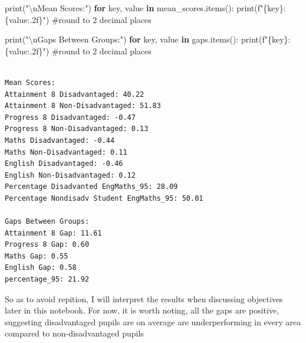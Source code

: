 \documentclass[
  letterpaper,
  DIV=11,
  numbers=noendperiod]{scrartcl}
\newenvironment{Shaded}{\begin{snugshade}}{\end{snugshade}}
\newcommand{\BuiltInTok}[1]{\textcolor[rgb]{0.00,0.23,0.31}{#1}}
\newcommand{\CharTok}[1]{\textcolor[rgb]{0.13,0.47,0.30}{#1}}
\newcommand{\CommentTok}[1]{\textcolor[rgb]{0.37,0.37,0.37}{#1}}
\newcommand{\ControlFlowTok}[1]{\textcolor[rgb]{0.00,0.23,0.31}{\textbf{#1}}}
\newcommand{\KeywordTok}[1]{\textcolor[rgb]{0.00,0.23,0.31}{\textbf{#1}}}
\newcommand{\NormalTok}[1]{\textcolor[rgb]{0.00,0.23,0.31}{#1}}
\newcommand{\SpecialCharTok}[1]{\textcolor[rgb]{0.37,0.37,0.37}{#1}}
\newcommand{\SpecialStringTok}[1]{\textcolor[rgb]{0.13,0.47,0.30}{#1}}
\newcommand{\StringTok}[1]{\textcolor[rgb]{0.13,0.47,0.30}{#1}}
\begin{document}
\begin{Shaded}
\begin{Highlighting}[]
\BuiltInTok{print}\NormalTok{(}\StringTok{"}\CharTok{\textbackslash{}n}\StringTok{Mean Scores:"}\NormalTok{)}
\ControlFlowTok{for}\NormalTok{ key, value }\KeywordTok{in}\NormalTok{ mean\_scores.items():}
    \BuiltInTok{print}\NormalTok{(}\SpecialStringTok{f"}\SpecialCharTok{\{}\NormalTok{key}\SpecialCharTok{\}}\SpecialStringTok{: }\SpecialCharTok{\{}\NormalTok{value}\SpecialCharTok{:.2f\}}\SpecialStringTok{"}\NormalTok{) }\CommentTok{\#round to 2 decimal places}

\BuiltInTok{print}\NormalTok{(}\StringTok{"}\CharTok{\textbackslash{}n}\StringTok{Gaps Between Groups:"}\NormalTok{)}
\ControlFlowTok{for}\NormalTok{ key, value }\KeywordTok{in}\NormalTok{ gaps.items():}
    \BuiltInTok{print}\NormalTok{(}\SpecialStringTok{f"}\SpecialCharTok{\{}\NormalTok{key}\SpecialCharTok{\}}\SpecialStringTok{: }\SpecialCharTok{\{}\NormalTok{value}\SpecialCharTok{:.2f\}}\SpecialStringTok{"}\NormalTok{) }\CommentTok{\#round to 2 decimal places}

\end{Highlighting}
\end{Shaded}

\begin{verbatim}

Mean Scores:
Attainment 8 Disadvantaged: 40.22
Attainment 8 Non-Disadvantaged: 51.83
Progress 8 Disadvantaged: -0.47
Progress 8 Non-Disadvantaged: 0.13
Maths Disadvantaged: -0.44
Maths Non-Disadvantaged: 0.11
English Disadvantaged: -0.46
English Non-Disadvantaged: 0.12
Percentage Disadvanted EngMaths_95: 28.09
Percentage Nondisadv Student EngMaths_95: 50.01

Gaps Between Groups:
Attainment 8 Gap: 11.61
Progress 8 Gap: 0.60
Maths Gap: 0.55
English Gap: 0.58
percentage_95: 21.92
\end{verbatim}

So as to avoid repition, I will interpret the results when discussing
objectives later in this notebook. For now, it is worth noting, all the
gaps are positive, suggesting disadvantaged pupils are on average are
underperforming in every area compared to non-disadvantaged pupils
\end{document}
